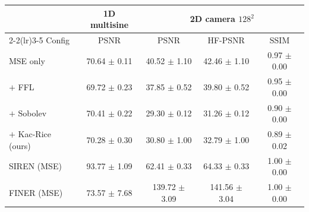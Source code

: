 \begin{tabular}{lcccc}
\toprule
 & \multicolumn{1}{c}{1D multisine} & \multicolumn{3}{c}{2D camera $128^2$} \\
\cmidrule(lr){2-2}\cmidrule(lr){3-5}
Config & PSNR & PSNR & HF-PSNR & SSIM \\
\midrule
MSE only & 70.64 $\pm$ 0.11 & 40.52 $\pm$ 1.10 & 42.46 $\pm$ 1.10 & 0.97 $\pm$ 0.00 \\
$+$ FFL & 69.72 $\pm$ 0.23 & 37.85 $\pm$ 0.52 & 39.80 $\pm$ 0.52 & 0.95 $\pm$ 0.00 \\
$+$ Sobolev & 70.41 $\pm$ 0.22 & 29.30 $\pm$ 0.12 & 31.26 $\pm$ 0.12 & 0.90 $\pm$ 0.00 \\
$+$ Kac-Rice (ours) & 70.28 $\pm$ 0.30 & 30.80 $\pm$ 1.00 & 32.79 $\pm$ 1.00 & 0.89 $\pm$ 0.02 \\
SIREN (MSE) & 93.77 $\pm$ 1.09 & 62.41 $\pm$ 0.33 & 64.33 $\pm$ 0.33 & 1.00 $\pm$ 0.00 \\
FINER (MSE) & 73.57 $\pm$ 7.68 & 139.72 $\pm$ 3.09 & 141.56 $\pm$ 3.04 & 1.00 $\pm$ 0.00 \\
\bottomrule
\end{tabular}